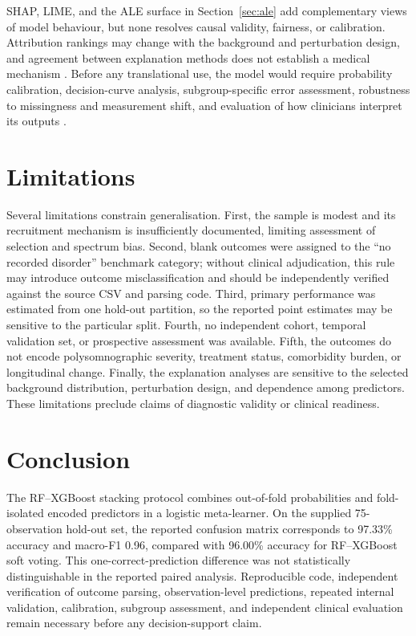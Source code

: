 \documentclass[a4paper,fleqn]{cas-dc}
\begin{document}
SHAP, LIME, and the ALE surface in Section~\ref{sec:ale} add complementary views of model behaviour, but none resolves causal validity, fairness, or calibration. Attribution rankings may change with the background and perturbation design, and agreement between explanation methods does not establish a medical mechanism \cite{instanceshap2023,jung2023,pesapane2026}. Before any translational use, the model would require probability calibration, decision-curve analysis, subgroup-specific error assessment, robustness to missingness and measurement shift, and evaluation of how clinicians interpret its outputs \cite{hu2024,tripodai2024,futureai2025}.

\section{Limitations}
Several limitations constrain generalisation. First, the sample is modest and its recruitment mechanism is insufficiently documented, limiting assessment of selection and spectrum bias. Second, blank outcomes were assigned to the ``no recorded disorder'' benchmark category; without clinical adjudication, this rule may introduce outcome misclassification and should be independently verified against the source CSV and parsing code. Third, primary performance was estimated from one hold-out partition, so the reported point estimates may be sensitive to the particular split. Fourth, no independent cohort, temporal validation set, or prospective assessment was available. Fifth, the outcomes do not encode polysomnographic severity, treatment status, comorbidity burden, or longitudinal change. Finally, the explanation analyses are sensitive to the selected background distribution, perturbation design, and dependence among predictors. These limitations preclude claims of diagnostic validity or clinical readiness.

\section{Conclusion}
The RF--XGBoost stacking protocol combines out-of-fold probabilities and fold-isolated encoded predictors in a logistic meta-learner. On the supplied 75-observation hold-out set, the reported confusion matrix corresponds to 97.33\% accuracy and macro-F1 0.96, compared with 96.00\% accuracy for RF--XGBoost soft voting. This one-correct-prediction difference was not statistically distinguishable in the reported paired analysis. Reproducible code, independent verification of outcome parsing, observation-level predictions, repeated internal validation, calibration, subgroup assessment, and independent clinical evaluation remain necessary before any decision-support claim.
\end{document}
